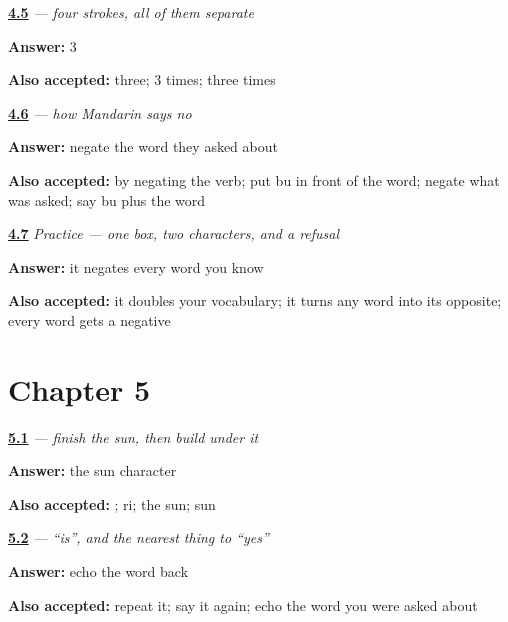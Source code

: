 \noindent\begin{minipage}[t]{\linewidth}
\raggedright
\hyperlink{review-ZH-W04-bu-lifts}{\textbf{4.5}} \emph{ — four strokes, all of them separate}\par
\small \textbf{Answer:} 3\par
\footnotesize \textbf{Also accepted:} three; 3 times; three times
\end{minipage}\par\medskip

\noindent\begin{minipage}[t]{\linewidth}
\raggedright
\hyperlink{review-ZH-C04-bu-no}{\textbf{4.6}} \emph{ — how Mandarin says no}\par
\small \textbf{Answer:} negate the word they asked about\par
\footnotesize \textbf{Also accepted:} by negating the verb; put bu in front of the word; negate what was asked; say bu plus the word
\end{minipage}\par\medskip

\noindent\begin{minipage}[t]{\linewidth}
\raggedright
\hyperlink{review-ZH-C04-practice-double}{\textbf{4.7}} \emph{Practice — one box, two characters, and a refusal}\par
\small \textbf{Answer:} it negates every word you know\par
\footnotesize \textbf{Also accepted:} it doubles your vocabulary; it turns any word into its opposite; every word gets a negative
\end{minipage}\par\medskip

\section*{Chapter 5}

\noindent\begin{minipage}[t]{\linewidth}
\raggedright
\hyperlink{review-ZH-W05-shi-top}{\textbf{5.1}} \emph{ — finish the sun, then build under it}\par
\small \textbf{Answer:} the sun character\par
\footnotesize \textbf{Also accepted:} ; ri; the sun; sun
\end{minipage}\par\medskip

\noindent\begin{minipage}[t]{\linewidth}
\raggedright
\hyperlink{review-ZH-C05-shi-yes}{\textbf{5.2}} \emph{ — \textquotedblleft{}is\textquotedblright{}, and the nearest thing to \textquotedblleft{}yes\textquotedblright{}}\par
\small \textbf{Answer:} echo the word back\par
\footnotesize \textbf{Also accepted:} repeat it; say it again; echo the word you were asked about
\end{minipage}\par\medskip


